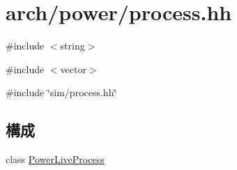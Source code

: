 \hypertarget{arch_2power_2process_8hh}{
\section{arch/power/process.hh}
\label{arch_2power_2process_8hh}
}
{\ttfamily \#include $<$string$>$}\par
{\ttfamily \#include $<$vector$>$}\par
{\ttfamily \#include \char`\"{}sim/process.hh\char`\"{}}\par
\subsection*{構成}
\begin{DoxyCompactItemize}
\item 
class \hyperlink{classPowerLiveProcess}{PowerLiveProcess}
\end{DoxyCompactItemize}
